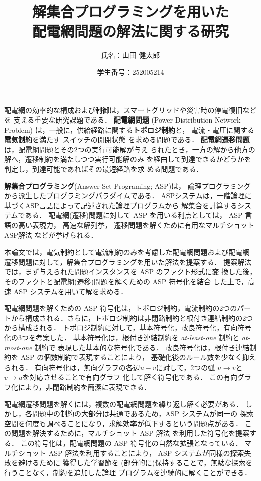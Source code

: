 \documentclass[dvipdfmx,a4paper]{jsarticle}
\title{\vspace{-3cm}解集合プログラミングを用いた\\配電網問題の解法に関する研究}
\author{氏名：山田 健太郎}
\date{学生番号：252005214}
\begin{document}
\maketitle

配電網の効率的な構成および制御は，スマートグリッドや災害時の停電復旧などを
支える重要な研究課題である．
%
\textbf{配電網問題}
(Power Distribution Network Problem)%
は，一般に，供給経路に関する\textbf{トポロジ制約}と，
電流・電圧に関する\textbf{電気制約}を満たす%
スイッチの開閉状態
を求める問題である．
%
\textbf{配電網遷移問題}は，配電網問題とその2つの実行可能解が与え
られたとき，一方の解から他方の解へ，遷移制約を満たしつつ実行可能解のみ
を経由して到達できるかどうかを判定し，到達可能であればその最短経路を求
める問題である．

\textbf{解集合プログラミング}(Answer Set Programing; ASP)は，
論理プログラミングから派生したプログラミングパラダイムである．
ASPシステムは，一階論理に基づくASP言語によって記述された論理プログラムから
解集合を計算するシステムである．
配電網(遷移)問題に対して ASP を用いる利点としては，
ASP 言語の高い表現力，
高速な解列挙，
遷移問題を解くために有用なマルチショットASP解法
などが挙げられる．

本論文では，電気制約として電流制約のみを考慮した配電網問題および配電網
遷移問題に対して，解集合プログラミングを用いた解法を提案する．
提案解法では，まず与えられた問題インスタンスを ASP のファクト形式に変
換した後，そのファクトと配電網(遷移)問題を解くための ASP 符号化を結合
した上で，高速 ASP システムを用いて解を求める．

配電網問題を解くための ASP 符号化は，トポロジ制約，電流制約の2つのパー
トから構成される．さらに，トポロジ制約は非閉路制約と根付き連結制約の2つ
から構成される．
トポロジ制約に対して，基本符号化，改良符号化，有向符号化の3つを考案した．
基本符号化は，根付き連結制約を \textit{at-least-one} 制約と \textit{at-most-one} 制約で
表現した基本的な符号化である．
改良符号化は，根付き連結制約を ASP の個数制約で表現することにより，
基礎化後のルール数を少なく抑えられる．
有向符号化は，無向グラフの各辺$u-v$に対して，2つの弧
$u\rightarrow v$と$v\rightarrow u$を対応させることで有向グラフ
化して解く符号化である．
この有向グラフ化により，非閉路制約を簡潔に表現できる．

配電網遷移問題を解くには，複数の配電網問題を繰り返し解く必要がある．
しかし，各問題中の制約の大部分は共通であるため，ASP システムが同一の
探索空間を何度も調べることになり，求解効率が低下するという問題点がある．
この問題を解決するために，マルチショット ASP 解法%
を利用した符号化を提案する．
この符号化は，配電網問題の ASP 符号化の自然な拡張となっている．
マルチショット ASP 解法を利用することにより，
ASP システムが同様の探索失敗を避けるために
獲得した学習節を
(部分的に)保持することで，無駄な探索を行うことなく，制約を追加した論理
プログラムを連続的に解くことができる．
\end{document}
